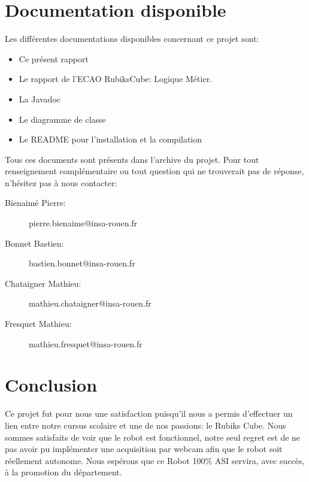 \documentclass[a4paper,12pt]{article}
\begin{document}
\section{Documentation disponible}

Les différentes documentations disponibles concernant ce projet sont:

\begin{itemize}
 \item Ce présent rapport
 \item Le rapport de l'ECAO RubiksCube: Logique Métier.
 \item La Javadoc
 \item Le diagramme de classe
 \item Le README pour l'installation et la compilation
\end{itemize}

Tous ces documents sont présents dans l'archive du projet.
Pour tout renseignement complémentaire ou tout question qui ne trouverait pas de réponse, n'hésitez pas à nous contacter:

\begin{description}
 \item[Bienaimé Pierre: ] pierre.bienaime@insa-rouen.fr
 \item[Bonnet Bastien: ] bastien.bonnet@insa-rouen.fr
 \item[Chataigner Mathieu: ] mathieu.chataigner@insa-rouen.fr
 \item[Fresquet Mathieu: ] mathieu.fresquet@insa-rouen.fr
\end{description}

\section{Conclusion}

Ce projet fut pour nous une satisfaction puisqu'il nous a permis d'effectuer un lien entre notre cursus scolaire et une de nos passions: le Rubiks Cube. Nous sommes satisfaits de voir que le robot est fonctionnel, notre seul regret est de ne pas avoir pu implémenter une acquisition par webcam afin que le robot soit réellement autonome. Nous espérons que ce Robot 100\% ASI servira, avec succès, à la promotion du département.
\end{document}
